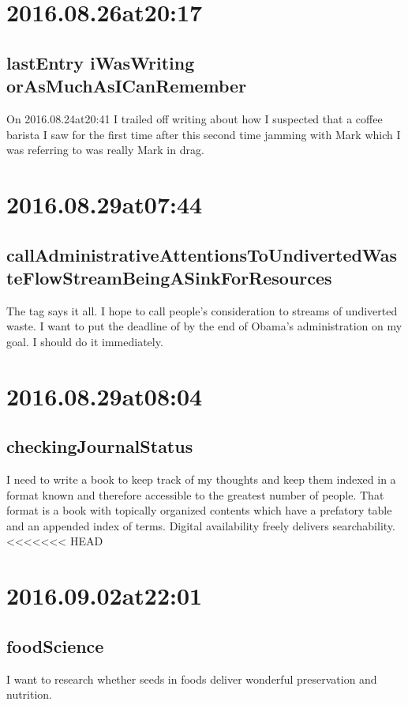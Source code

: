 \begin{enumerate}
\begin{enumerate}
\section*{ 2016.08.26at20:17 }
\subsection*{lastEntry iWasWriting orAsMuchAsICanRemember}
On 2016.08.24at20:41 I trailed off writing about how I suspected that a coffee barista I saw for the first time after this second time jamming with Mark which I was referring to was really Mark in drag.

\section*{ 2016.08.29at07:44 }
\subsection*{callAdministrativeAttentionsToUndivertedWasteFlowStreamBeingASinkForResources}
The tag says it all. I hope to call people's consideration to streams of undiverted waste. I want to put the deadline of by the end of Obama's administration on my goal. I should do it immediately.

\section*{ 2016.08.29at08:04 }
\subsection*{checkingJournalStatus}
I need to write a book to keep track of my thoughts and keep them indexed in a format known and therefore accessible to the greatest number of people. That format is a book with topically organized contents which have a prefatory table and an appended index of terms. Digital availability freely delivers searchability.
<<<<<<< HEAD

\section*{ 2016.09.02at22:01 }
\subsection*{ foodScience }
I want to research whether seeds in foods deliver wonderful preservation and nutrition.


\end{enumerate}
\end{enumerate}

